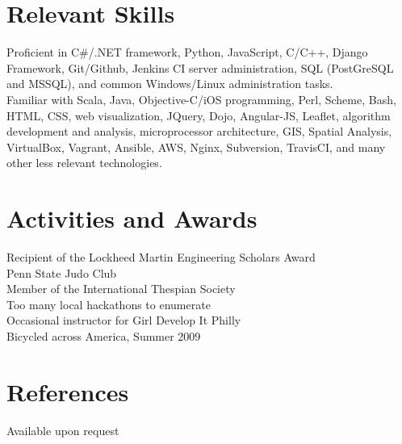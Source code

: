 \documentclass{res}
\begin{document}
\begin{resume}
\section{Relevant Skills}
Proficient in C\#/.NET framework, Python, JavaScript, C/C++, Django Framework,
Git/Github, Jenkins CI server administration, SQL (PostGreSQL and MSSQL), 
and common Windows/Linux administration tasks.\\
Familiar with Scala, Java, Objective-C/iOS programming, Perl, Scheme, Bash, HTML, CSS,
web visualization, JQuery, Dojo, Angular-JS, Leaflet, algorithm development
and analysis, microprocessor architecture, GIS, Spatial Analysis,
VirtualBox, Vagrant, Ansible, AWS, Nginx, Subversion, TravisCI,
and many other less relevant technologies.
 
\section{Activities and Awards}          
    Recipient of the Lockheed Martin Engineering Scholars Award\\
    Penn State Judo Club\\
    Member of the International Thespian Society\\
    Too many local hackathons to enumerate\\
    Occasional instructor for Girl Develop It Philly\\
    Bicycled across America, Summer 2009

\section{References}
    Available upon request
 
\end{resume}
\end{document}
